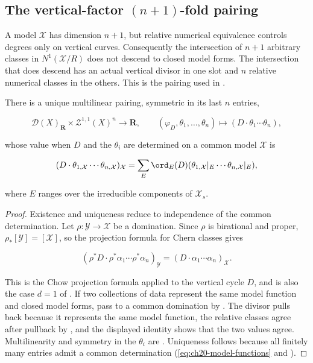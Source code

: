 \subsection{The vertical-factor \texorpdfstring{\((n+1)\)}{(n+1)}-fold pairing}
\label{sec:ch20-pairing}

A model \(\mathcal X\) has dimension \(n+1\), but relative numerical
equivalence controls degrees only on vertical curves.  Consequently the
intersection of \(n+1\) arbitrary classes in \(N^1(\mathcal X/R)\) does not
descend to closed model forms.  The intersection that does descend has an
actual vertical divisor in one slot and \(n\) relative numerical classes in
the others.  This is the pairing used in \cite[\S2.7]{BFJ15}.

\begin{proposition}
\label{prop:ch20-intersection-pairing}
There is a unique multilinear pairing, symmetric in its last \(n\) entries,

\begin{equation}
\label{eq:ch20-intersection-pairing}
 \mathcal D(X)_{\mathbf R}\times\mathcal Z^{1,1}(X)^n
 \longrightarrow\mathbf R,
 \qquad
 (\varphi_D,\theta_1,\ldots,\theta_n)\longmapsto
 (D\cdot\theta_1\cdots\theta_n),
\end{equation}

whose value when \(D\) and the \(\theta_i\) are determined on a common model
\(\mathcal X\) is

\[
 (D\cdot\theta_{1,\mathcal X}\cdots\theta_{n,\mathcal X})_{\mathcal X}
 =\sum_E\ord_E(D)
   (\theta_{1,\mathcal X}|_E\cdots\theta_{n,\mathcal X}|_E),
\]

where \(E\) ranges over the irreducible components of \(\mathcal X_s\).
\end{proposition}

\begin{proof}
Existence and uniqueness reduce to independence of the common determination.
Let \(\rho:\mathcal Y\to\mathcal X\) be a domination.  Since \(\rho\) is
birational and proper, \(\rho_*[\mathcal Y]=[\mathcal X]\), so the
projection formula for Chern classes gives

\[
 (\rho^*D\cdot\rho^*\alpha_1\cdots\rho^*\alpha_n)_{\mathcal Y}
 =(D\cdot\alpha_1\cdots\alpha_n)_{\mathcal X}.
\]

This is the Chow projection formula  applied to
the vertical cycle \(D\), and is also the case \(d=1\) of
.  If two collections of data represent
the same model function and closed model forms, pass to a common domination
by .  The divisor pulls back because it
represents the same model function, the relative classes agree after
pullback by , and the displayed identity
shows that the two values agree.  Multilinearity and symmetry in the
\(\theta_i\) are .  Uniqueness follows because
all finitely many entries admit a common determination
(\eqref{eq:ch20-model-functions} and
).
\end{proof}

